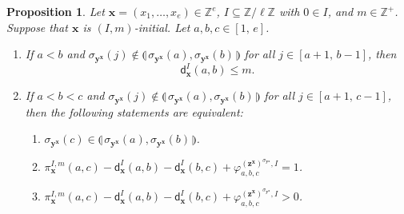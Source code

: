 \documentclass[11pt,a4paper,reqno]{amsart}
\numberwithin{equation}{section}
\theoremstyle{plain}
\newtheorem{prop}[thm]{Proposition}
\theoremstyle{definition}
\theoremstyle{remark}
\numberwithin{equation}{section}
\newcommand{\bx}{\mathbf{x}}
\newcommand{\by}{\mathbf{y}}
\newcommand{\bz}{\mathbf{z}}
\newcommand{\ZZ}{\mathbb{Z}}
\newcommand{\ff}{\varphi}
\newcommand{\dd}{\mathsf{d}}
\newcommand{\ft}[2]{\llparenthesis\, #1,#2 \,\rrparenthesis}
\begin{document}
\begin{prop} \label{P:initial}
Let $\bx = (x_1,\dotsc, x_e) \in \ZZ^e$, $I \subseteq \ZZ/\ell\ZZ$ with $0 \in I$, and $m \in \ZZ^+$.
Suppose that $\bx$ is $(I,m)$-initial.
Let 
$a,b, c\in [1,\,e]$.

\begin{enumerate}
\item
If $a < b$ and $\sigma_{\by^\bx}(j) \notin \ft{\sigma_{\by^\bx}(a)}{\sigma_{\by^\bx}(b)}$ for all $j \in [a+1,\,b-1]$,
then
    $$
    \dd_{\bx}^I
    (a,b) \leq m.
    $$

\item
If $a < b < c$ and $\sigma_{\by^\bx}(j) \notin \ft{\sigma_{\by^\bx}(a)}{\sigma_{\by^\bx}(b)}$ for all $j \in [a+1,\, c-1]$, %
then the following
statements are equivalent:
\begin{enumerate}
\item  $\sigma_{\by^\bx}(c) \in \ft{\sigma_{\by^\bx}(a)}{\sigma_{\by^\bx}(b)}$.
\item $\pi_{\bx}^{I,m}(a,c) - \dd_{\bx}^I(a,b) - \dd_{\bx}^I(b,c) + \ff^{(\bz^{\bx})^{\sigma_{\by^{\bx}}},I}_{a,b,c} = 1$.
\item $\pi_{\bx}^{I,m}(a,c) - \dd_{\bx}^I(a,b) - \dd_{\bx}^I(b,c) + \ff^{(\bz^{\bx})^{\sigma_{\by^{\bx}}},I}_{a,b,c} > 0$.
\end{enumerate}
\end{enumerate}
\end{prop}
\end{document}
